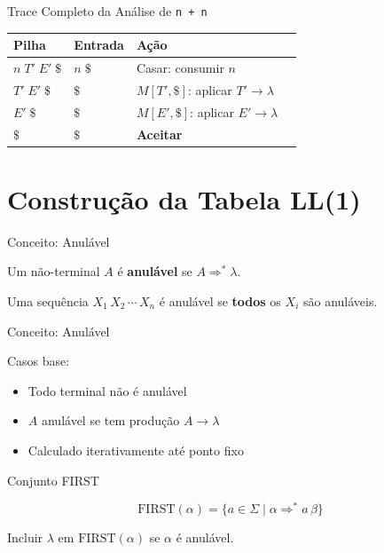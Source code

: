 \begin{frame}{Trace Completo da Análise de
    \texttt{n + n}}

    \begin{table}
        \begin{tabular}{l l l l}
            \hline
            Pilha & Entrada & Ação \\
            \hline
            \(n\;T'\;E'\;\$\) & \(n\;\$\) & Casar: consumir \(n\) \\
            \(T'\;E'\;\$\) & \(\$\) & \(M[T',\$]\): aplicar \(T' \to \lambda\) \\
            \(E'\;\$\) & \(\$\) & \(M[E',\$]\): aplicar \(E' \to \lambda\) \\
            \(\$\) & \(\$\) & \textbf{Aceitar} \\
            \hline
        \end{tabular}
    \end{table}
\end{frame}


\section{Construção da Tabela
LL(1)}\label{construuxe7uxe3o-da-tabela-ll1}

\begin{frame}{Conceito: Anulável}

    Um não-terminal \(A\) é \textbf{anulável} se
    \(A \Rightarrow^* \lambda\).

    Uma sequência \(X_1\, X_2\, \cdots\, X_n\) é anulável se \textbf{todos}
    os \(X_i\) são anuláveis.
\end{frame}

\begin{frame}{Conceito: Anulável}

    Casos base:

    \begin{itemize}

        \item
        Todo terminal não é anulável
        \item
        \(A\) anulável se tem produção \(A \to \lambda\)
        \item
        Calculado iterativamente até ponto fixo
    \end{itemize}
\end{frame}

\begin{frame}{Conjunto FIRST}

    \[\mathrm{FIRST}(\alpha) = \{a \in \Sigma \mid \alpha \Rightarrow^* a\,\beta\}\]

    Incluir \(\lambda\) em \(\mathrm{FIRST}(\alpha)\) se \(\alpha\) é
    anulável.
\end{frame}

